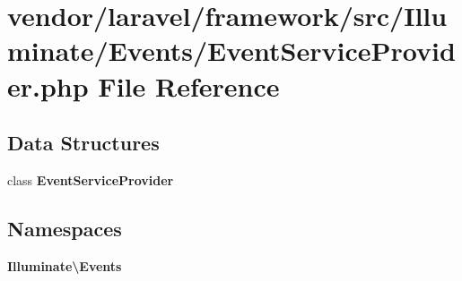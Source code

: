 \section{vendor/laravel/framework/src/\+Illuminate/\+Events/\+Event\+Service\+Provider.php File Reference}
\label{vendor_2laravel_2framework_2src_2_illuminate_2_events_2_event_service_provider_8php}
\subsection*{Data Structures}
\begin{DoxyCompactItemize}
\item 
class {\bf Event\+Service\+Provider}
\end{DoxyCompactItemize}
\subsection*{Namespaces}
\begin{DoxyCompactItemize}
\item 
 {\bf Illuminate\textbackslash{}\+Events}
\end{DoxyCompactItemize}
